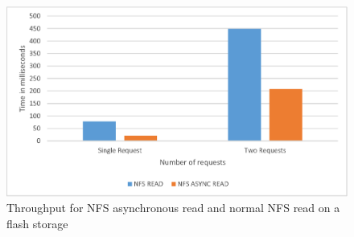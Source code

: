 \begin{figure}
\centering
\includegraphics[scale=1.0]{figures/Throughput.eps}
\caption{Throughput for NFS asynchronous read and normal NFS read on a flash storage}
\label{fig:NFSThroughput}
\end{figure}




